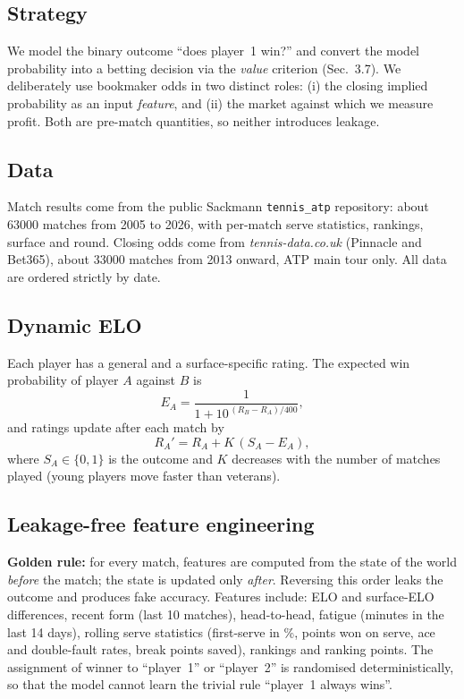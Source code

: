 \documentclass[10pt,twocolumn]{article}
\begin{document}
\subsection{Strategy}
We model the binary outcome ``does player~1 win?'' and convert the model
probability into a betting decision via the \emph{value} criterion (Sec.~3.7).
We deliberately use bookmaker odds in two distinct roles: (i) the closing
implied probability as an input \emph{feature}, and (ii) the market against which
we measure profit. Both are pre-match quantities, so neither introduces leakage.

\subsection{Data}
Match results come from the public Sackmann \texttt{tennis\_atp} repository:
about \num{63000} matches from 2005 to 2026, with per-match serve statistics,
rankings, surface and round. Closing odds come from \textit{tennis-data.co.uk}
(Pinnacle and Bet365), about \num{33000} matches from 2013 onward, ATP main tour
only. All data are ordered strictly by date.

\subsection{Dynamic ELO}
Each player has a general and a surface-specific rating. The expected win
probability of player $A$ against $B$ is
\begin{equation}
  E_A = \frac{1}{1 + 10^{\,(R_B - R_A)/400}},
\end{equation}
and ratings update after each match by
\begin{equation}
  R_A' = R_A + K\,(S_A - E_A),
\end{equation}
where $S_A\in\{0,1\}$ is the outcome and $K$ decreases with the number of matches
played (young players move faster than veterans).

\subsection{Leakage-free feature engineering}
\textbf{Golden rule:} for every match, features are computed from the state of
the world \emph{before} the match; the state is updated only \emph{after}.
Reversing this order leaks the outcome and produces fake accuracy. Features
include: ELO and surface-ELO differences, recent form (last 10 matches),
head-to-head, fatigue (minutes in the last 14 days), rolling serve statistics
(first-serve in \%, points won on serve, ace and double-fault rates,
break points saved), rankings and ranking points. The assignment of winner to
``player~1'' or ``player~2'' is randomised deterministically, so that the model
cannot learn the trivial rule ``player~1 always wins''.
\end{document}
